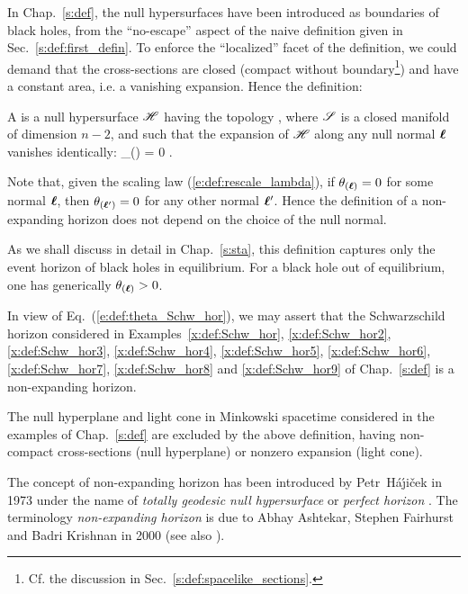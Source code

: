 In Chap.~\ref{s:def}, the null hypersurfaces have been introduced as boundaries
of black holes, from the ``no-escape'' aspect of the naive definition given in
Sec.~\ref{s:def:first_defin}. To enforce the ``localized'' facet of the definition,
we could demand that the cross-sections are closed (compact without boundary\footnote{Cf. the discussion in Sec.~\ref{s:def:spacelike_sections}.})
and have a constant area, i.e. a vanishing expansion. Hence the definition:
\begin{greybox}
A  is a null hypersurface $\mathscr{H}$ having the
topology
\be \label{e:neh:H_topology}
    \Hor \simeq \R \times \Sp,
\ee
where $\mathscr{S}$ is a closed manifold of dimension $n-2$,
and such that the expansion of $\mathscr{H}$ along any null normal $\bm{\ell}$ vanishes
identically:
\be
    \theta_{(\wl)} = 0 .
\ee
\end{greybox}
\begin{remark}
Note that, given the scaling law (\ref{e:def:rescale_lambda}),
if $\theta_{(\bm{\ell})} = 0$ for some normal $\bm{\ell}$, then  $\theta_{(\bm{\ell}')} = 0$
for any other normal $\bm{\ell}'$. Hence the definition of a non-expanding horizon
does not depend on the choice of the null normal.
\end{remark}
As we shall discuss in detail in Chap.~\ref{s:sta}, this definition captures only
the event horizon of black holes in equilibrium. For a black hole out of equilibrium,
one has generically $\theta_{(\bm{\ell})} > 0$.

\begin{example}
In view of Eq.~(\ref{e:def:theta_Schw_hor}), we may assert that the
Schwarz\-schild horizon considered in Examples~\ref{x:def:Schw_hor}, \ref{x:def:Schw_hor2},
\ref{x:def:Schw_hor3}, \ref{x:def:Schw_hor4}, \ref{x:def:Schw_hor5}, \ref{x:def:Schw_hor6},
\ref{x:def:Schw_hor7}, \ref{x:def:Schw_hor8} and \ref{x:def:Schw_hor9}
of Chap.~\ref{s:def}
is a non-expanding horizon.
\end{example}

\begin{example}
The null hyperplane and light cone in Minkowski spacetime considered
in the examples of Chap.~\ref{s:def} are excluded by the above definition,
having non-compact cross-sections (null hyperplane) or nonzero expansion
(light cone).
\end{example}

\begin{hist}\label{h:neh:NEH}
The concept of non-expanding horizon has been introduced by
Petr~H\'a\'\j i\v{c}ek
in 1973 under the name of \emph{totally geodesic null hypersurface} \cite{Hajic73a}
or \emph{perfect horizon} \cite{Hajic73b,Hajic74}.
The terminology \emph{non-expanding horizon} is due to
Abhay Ashtekar, Stephen Fairhurst
and Badri Krishnan in 2000 \cite{AshteFK00} (see also \cite{AshteBL02}).
\end{hist}

